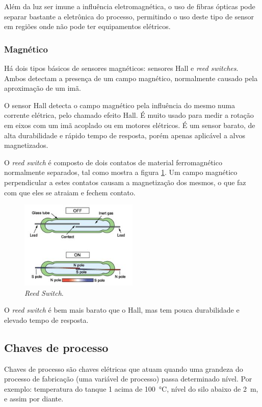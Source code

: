 Além da luz ser imune a influência eletromagnética, o uso de fibras ópticas pode separar bastante a eletrônica do processo, permitindo o uso deste tipo de sensor em regiões onde não pode ter equipamentos elétricos.

\subsubsection{Magnético}
\label{subs:Magnetico}

Há dois tipos básicos de sensores magnéticos: sensores Hall e \emph{reed switches}. Ambos detectam a presença de um campo magnético, normalmente causado pela aproximação de um imã.

O sensor Hall detecta o campo magnético pela influência do mesmo numa corrente elétrica, pelo chamado efeito Hall. É muito usado para medir a rotação em eixos com um imã acoplado ou em motores elétricos. É um sensor barato, de alta durabilidade e rápido tempo de resposta, porém apenas aplicável a alvos magnetizados.

O \emph{reed switch} é composto de dois contatos de material ferromagnético normalmente separados, tal como mostra a figura \ref{fig:reed}. Um campo magnético perpendicular a estes contatos causam a magnetização dos mesmos, o que faz com que eles se atraiam e fechem contato.

\begin{figure}
  \centering
  \includegraphics[width=0.5\textwidth]{figuras/reed}
  \caption{\emph{Reed Switch}.}\label{fig:reed}
\end{figure}

O \emph{reed switch} é bem mais barato que o Hall, mas tem pouca durabilidade e elevado tempo de resposta.

\subsection{Chaves de processo}

Chaves de processo são chaves elétricas que atuam quando uma grandeza do processo de fabricação (uma variável de processo) passa determinado nível. Por exemplo: temperatura do tanque 1 acima de \SI{100}{\celsius}, nível do silo abaixo de \SI{2}{\meter}, e assim por diante.

